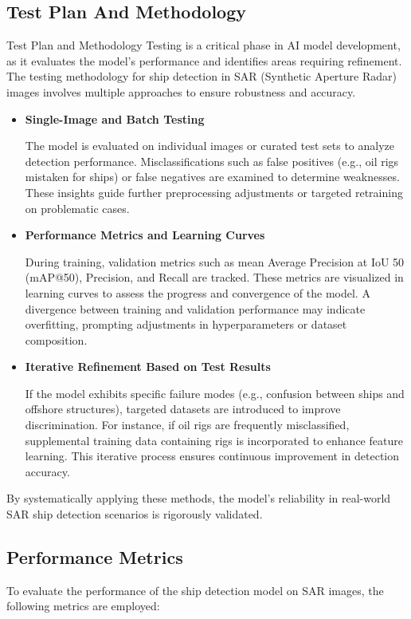 \documentclass{article}
\begin{document}
	\subsection{Test Plan And Methodology}
	Test Plan and Methodology
	Testing is a critical phase in AI model development, as it evaluates the model's performance and identifies areas requiring refinement. The testing methodology for ship detection in SAR (Synthetic Aperture Radar) images involves multiple approaches to ensure robustness and accuracy. \begin{itemize}
		\item \textbf{Single-Image and Batch Testing}
		
		The model is evaluated on individual images or curated test sets to analyze detection performance. Misclassifications such as false positives (e.g., oil rigs mistaken for ships) or false negatives are examined to determine weaknesses. These insights guide further preprocessing adjustments or targeted retraining on problematic cases. \item \textbf{Performance Metrics and Learning Curves}
		
		During training, validation metrics such as mean Average Precision at IoU 50 (mAP@50), Precision, and Recall are tracked. These metrics are visualized in learning curves to assess the progress and convergence of the model. A divergence between training and validation performance may indicate overfitting, prompting adjustments in hyperparameters or dataset composition. \item \textbf{Iterative Refinement Based on Test Results}
		
		If the model exhibits specific failure modes (e.g., confusion between ships and offshore structures), targeted datasets are introduced to improve discrimination. For instance, if oil rigs are frequently misclassified, supplemental training data containing rigs is incorporated to enhance feature learning. This iterative process ensures continuous improvement in detection accuracy.
	\end{itemize}
	
	By systematically applying these methods, the model’s reliability in real-world SAR ship detection scenarios is rigorously validated. \subsection{Performance Metrics}
	To evaluate the performance of the ship detection model on SAR images, the following metrics are employed:
\end{document}
